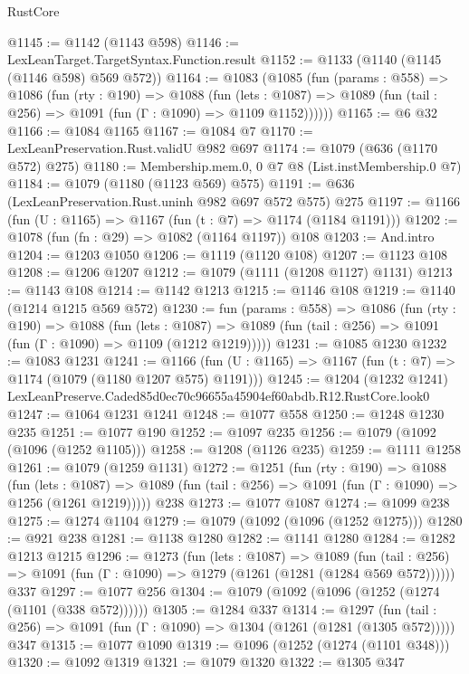 \begin{lexlean}{RustCore}
\begin{coremodule}
@1145 := @1142 (@1143 @598)
@1146 := LexLeanTarget.TargetSyntax.Function.result
@1152 := @1133 (@1140 (@1145 (@1146 @598) @569 @572))
@1164 := @1083
    (@1085
      (fun (params : @558) =>
      @1086
        (fun (rty : @190) =>
        @1088
          (fun (lets : @1087) =>
          @1089 (fun (tail : @256) => @1091 (fun (Γ : @1090) => @1109 @1152))))))
@1165 := @6 @32
@1166 := @1084 @1165
@1167 := @1084 @7
@1170 := LexLeanPreservation.Rust.validU @982 @697
@1174 := @1079 (@636 (@1170 @572) @275)
@1180 := Membership.mem.{0, 0} @7 @8 (List.instMembership.{0} @7)
@1184 := @1079 (@1180 (@1123 @569) @575)
@1191 := @636 (LexLeanPreservation.Rust.uninh @982 @697 @572 @575) @275
@1197 := @1166 (fun (U : @1165) => @1167 (fun (t : @7) => @1174 (@1184 @1191)))
@1202 := @1078 (fun (fn : @29) => @1082 (@1164 @1197)) @108
@1203 := And.intro
@1204 := @1203 @1050
@1206 := @1119 (@1120 @108)
@1207 := @1123 @108
@1208 := @1206 @1207
@1212 := @1079 (@1111 (@1208 @1127) @1131)
@1213 := @1143 @108
@1214 := @1142 @1213
@1215 := @1146 @108
@1219 := @1140 (@1214 @1215 @569 @572)
@1230 := fun (params : @558) =>
  @1086
    (fun (rty : @190) =>
    @1088
      (fun (lets : @1087) =>
      @1089 (fun (tail : @256) => @1091 (fun (Γ : @1090) => @1109 (@1212 @1219)))))
@1231 := @1085 @1230
@1232 := @1083 @1231
@1241 := @1166 (fun (U : @1165) => @1167 (fun (t : @7) => @1174 (@1079 (@1180 @1207 @575) @1191)))
@1245 := @1204 (@1232 @1241) LexLeanPreserve.Caded85d0ec70c96655a45904ef60abdb.R12.RustCore.look0
@1247 := @1064 @1231 @1241
@1248 := @1077 @558
@1250 := @1248 @1230 @235
@1251 := @1077 @190
@1252 := @1097 @235
@1256 := @1079 (@1092 (@1096 (@1252 @1105)))
@1258 := @1208 (@1126 @235)
@1259 := @1111 @1258
@1261 := @1079 (@1259 @1131)
@1272 := @1251
    (fun (rty : @190) =>
    @1088
      (fun (lets : @1087) =>
      @1089 (fun (tail : @256) => @1091 (fun (Γ : @1090) => @1256 (@1261 @1219)))))
    @238
@1273 := @1077 @1087
@1274 := @1099 @238
@1275 := @1274 @1104
@1279 := @1079 (@1092 (@1096 (@1252 @1275)))
@1280 := @921 @238
@1281 := @1138 @1280
@1282 := @1141 @1280
@1284 := @1282 @1213 @1215
@1296 := @1273
    (fun (lets : @1087) =>
    @1089 (fun (tail : @256) => @1091 (fun (Γ : @1090) => @1279 (@1261 (@1281 (@1284 @569 @572))))))
    @337
@1297 := @1077 @256
@1304 := @1079 (@1092 (@1096 (@1252 (@1274 (@1101 (@338 @572))))))
@1305 := @1284 @337
@1314 := @1297
    (fun (tail : @256) => @1091 (fun (Γ : @1090) => @1304 (@1261 (@1281 (@1305 @572)))))
    @347
@1315 := @1077 @1090
@1319 := @1096 (@1252 (@1274 (@1101 @348)))
@1320 := @1092 @1319
@1321 := @1079 @1320
@1322 := @1305 @347

\end{coremodule}
\end{lexlean}
